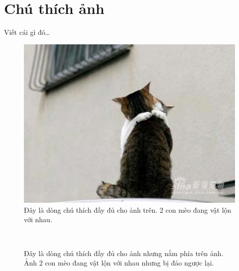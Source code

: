 \documentclass{article}
\begin{document}
\listoftables

\section{Chú thích ảnh}
\label{section:figure} %
Viết cái gì đó\ldots\\

\begin{figure}[h] %
\center
\includegraphics[scale=0.3]{meo}
\caption[Đây là dòng chú thích rút gọn cho ảnh 1]{Đây là dòng chú thích đầy đủ cho ảnh trên. 2 con mèo đang vật lộn với nhau.}
\label{figure:cat}
\end{figure}
\begin{figure}[h]
\center
\caption[Đây là dòng chú thích rút gọn cho ảnh 2]{Đây là dòng chú thích đầy đủ cho ảnh nhưng nằm phía trên ảnh. Ảnh 2 con mèo đang vật lộn với nhau nhưng bị đảo ngược lại.}
\label{figure:cat_reversed}
\hfill\\
\end{figure}
\end{document}
